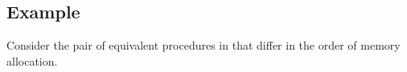\documentclass[runningheads,a4paper]{llncs}
\makeatletter
\newcommand*{\ie}{i.e.\@\xspace}
\makeatother
\begin{document}
%
%
%
%
%

\subsection{Example}\label{sec:example}
\newcommand*{\copylr}{\texttt{lcopy}}
\newcommand*{\copyrl}{\texttt{rcopy}}
\newcommand*{\lang}{\ensuremath{\mathcal{L}}}

Consider the pair of equivalent procedures in  that differ in the order of memory allocation.
\end{document}
